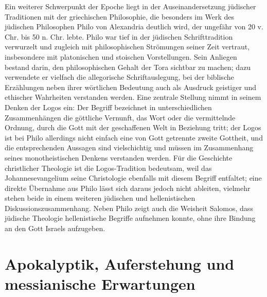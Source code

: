 \documentclass[fontsize=12pt]{mybib}
\begin{document}
Ein weiterer Schwerpunkt der Epoche liegt in der Auseinandersetzung jüdischer Traditionen mit der griechischen Philosophie, die besonders im Werk des jüdischen Philosophen Philo von Alexandria deutlich wird, der ungefähr von 20 v. Chr. bis 50 n. Chr. lebte. Philo war tief in der jüdischen Schrifttradition verwurzelt und zugleich mit philosophischen Strömungen seiner Zeit vertraut, insbesondere mit platonischen und stoischen Vorstellungen. Sein Anliegen bestand darin, den philosophischen Gehalt der Tora sichtbar zu machen; dazu verwendete er vielfach die allegorische Schriftauslegung, bei der biblische Erzählungen neben ihrer wörtlichen Bedeutung auch als Ausdruck geistiger und ethischer Wahrheiten verstanden werden. Eine zentrale Stellung nimmt in seinem Denken der Logos ein: Der Begriff bezeichnet in unterschiedlichen Zusammenhängen die göttliche Vernunft, das Wort oder die vermittelnde Ordnung, durch die Gott mit der geschaffenen Welt in Beziehung tritt; der Logos ist bei Philo allerdings nicht einfach eine von Gott getrennte zweite Gottheit, und die entsprechenden Aussagen sind vielschichtig und müssen im Zusammenhang seines monotheistischen Denkens verstanden werden. Für die Geschichte christlicher Theologie ist die Logos-Tradition bedeutsam, weil das Johannesevangelium seine Christologie ebenfalls mit diesem Begriff entfaltet; eine direkte Übernahme aus Philo lässt sich daraus jedoch nicht ableiten, vielmehr stehen beide in einem weiteren jüdischen und hellenistischen Diskussionszusammenhang. Neben Philo zeigt auch die Weisheit Salomos, dass jüdische Theologie hellenistische Begriffe aufnehmen konnte, ohne ihre Bindung an den Gott Israels aufzugeben.

\section{Apokalyptik, Auferstehung und messianische Erwartungen}
\end{document}
